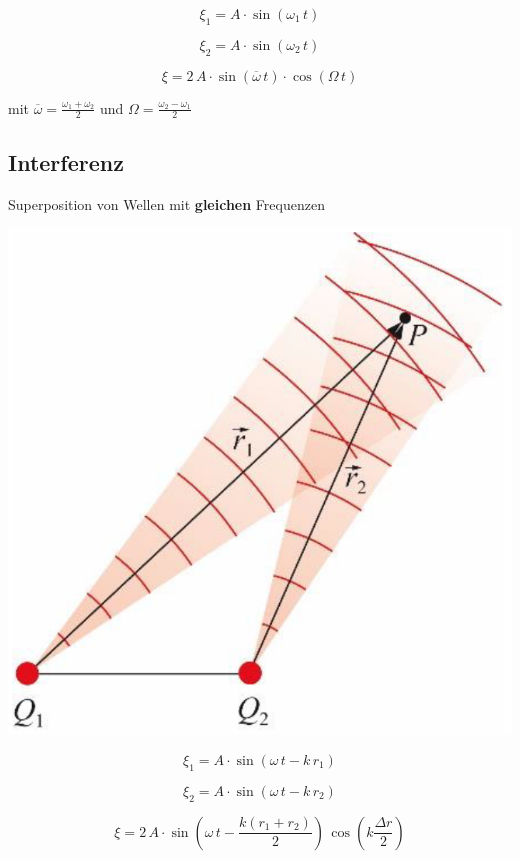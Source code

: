 \begin{minipage}{0.48\linewidth}
$$ \xi_1 = A \cdot \sin(\omega_1 \, t) $$
\end{minipage}
\hfill
\begin{minipage}{0.48\linewidth}
$$ \xi_2 = A \cdot \sin(\omega_2 \, t) $$
\end{minipage}

$$ \boxed{ \xi = 2 \, A \cdot \sin( \overline{\omega} \, t) \cdot \cos( \Omega \, t) }$$

mit $\overline{\omega} = \frac{\omega_1 + \omega_2}{2}$ und  $\Omega = \frac{\omega_2 - \omega_1}{2}$



\subsection{Interferenz}

Superposition von Wellen mit \textbf{gleichen} Frequenzen \\
\vspace{0.2cm}

\begin{minipage}{0.48\linewidth}
\includegraphics[width=0.7\linewidth]{Bilder/Wellen-Optik/interferenz} \\
\end{minipage}
\hfill
\begin{minipage}{0.48\linewidth}
$$ \xi_1 = A \cdot \sin(\omega \, t - k \, r_1) $$

$$ \xi_2 = A \cdot \sin(\omega \, t - k \, r_2) $$
\end{minipage}

$$ \boxed{ \xi = 2 \, A \cdot \sin \left( \omega \, t - \frac{k (r_1 + r_2)}{2} \right) \,  \cos \left( k \frac{\Delta r}{2}  \right) } $$

